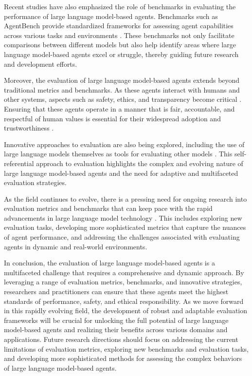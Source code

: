 \documentclass[11pt,a4paper]{article}
\begin{document}
Recent studies have also emphasized the role of benchmarks in evaluating the performance of large language model-based agents. Benchmarks such as AgentBench provide standardized frameworks for assessing agent capabilities across various tasks and environments \cite{arxiv:2308.03688}. These benchmarks not only facilitate comparisons between different models but also help identify areas where large language model-based agents excel or struggle, thereby guiding future research and development efforts.

Moreover, the evaluation of large language model-based agents extends beyond traditional metrics and benchmarks. As these agents interact with humans and other systems, aspects such as safety, ethics, and transparency become critical \cite{doi:10.1145/3604237.3626869}. Ensuring that these agents operate in a manner that is fair, accountable, and respectful of human values is essential for their widespread adoption and trustworthiness \cite{doi:10.1109/access.2024.3365742}.

Innovative approaches to evaluation are also being explored, including the use of large language models themselves as tools for evaluating other models \cite{arxiv:2212.09251}. This self-referential approach to evaluation highlights the complex and evolving nature of large language model-based agents and the need for adaptive and multifaceted evaluation strategies.

As the field continues to evolve, there is a pressing need for ongoing research into evaluation metrics and benchmarks that can keep pace with the rapid advancements in large language model technology \cite{arxiv:2402.01364}. This includes exploring new evaluation tasks, developing more sophisticated metrics that capture the nuances of agent performance, and addressing the challenges associated with evaluating agents in dynamic and real-world environments.

In conclusion, the evaluation of large language model-based agents is a multifaceted challenge that requires a comprehensive and dynamic approach. By leveraging a range of evaluation metrics, benchmarks, and innovative strategies, researchers and practitioners can ensure that these agents meet the highest standards of performance, safety, and ethical responsibility. As we move forward in this rapidly evolving field, the development of robust and adaptable evaluation frameworks will be crucial for unlocking the full potential of large language model-based agents and realizing their benefits across various domains and applications. Future research directions should focus on addressing the current limitations of evaluation metrics, exploring new benchmarks and evaluation tasks, and developing more sophisticated methods for assessing the complex behaviors of large language model-based agents.
\end{document}
